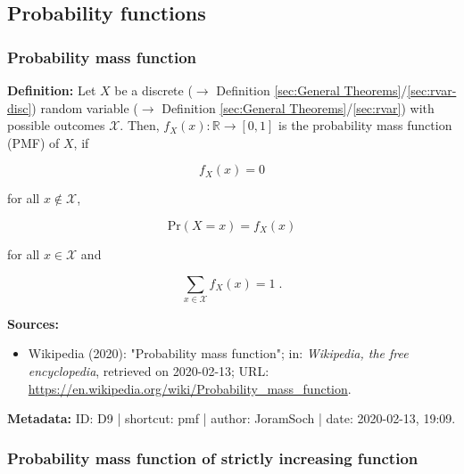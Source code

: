 \documentclass[a4paper,12pt,twoside]{book}
\begin{document}
\subsection{Probability functions}

\subsubsection[\textit{Probability mass function}]{Probability mass function} \label{sec:pmf}
\setcounter{equation}{0}

\textbf{Definition:} Let $X$ be a discrete ($\rightarrow$ Definition \ref{sec:General Theorems}/\ref{sec:rvar-disc}) random variable ($\rightarrow$ Definition \ref{sec:General Theorems}/\ref{sec:rvar}) with possible outcomes $\mathcal{X}$. Then, $f_X(x): \mathbb{R} \to [0,1]$ is the probability mass function (PMF) of $X$, if

\begin{equation} \label{eq:pmf-pmf-def-s0}
f_X(x) = 0
\end{equation}

for all $x \notin \mathcal{X}$,

\begin{equation} \label{eq:pmf-pmf-def-s1}
\mathrm{Pr}(X = x) = f_X(x)
\end{equation}

for all $x \in \mathcal{X}$ and

\begin{equation} \label{eq:pmf-pmf-def-s2}
\sum_{x \in \mathcal{X}} f_X(x) = 1 \; .
\end{equation}


\vspace{1em}
\textbf{Sources:}
\begin{itemize}
\item Wikipedia (2020): "Probability mass function"; in: \textit{Wikipedia, the free encyclopedia}, retrieved on 2020-02-13; URL: \url{https://en.wikipedia.org/wiki/Probability_mass_function}.
\end{itemize}


\vspace{1em}
\textbf{Metadata:} ID: D9 | shortcut: pmf | author: JoramSoch | date: 2020-02-13, 19:09.
\vspace{1em}



\subsubsection[\textbf{Probability mass function of strictly increasing function}]{Probability mass function of strictly increasing function} \label{sec:pmf-sifct}
\setcounter{equation}{0}
\end{document}
